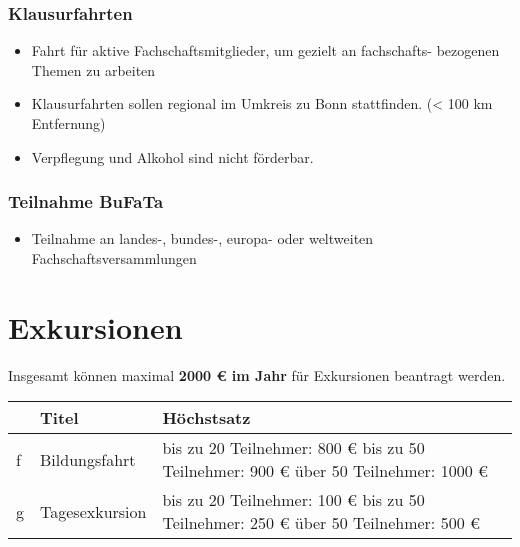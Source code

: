 \documentclass{article}
\begin{document}
        \subsubsection{Klausurfahrten}
            \begin{itemize}
                \item  Fahrt für aktive Fachschaftsmitglieder, um gezielt an fachschafts- bezogenen Themen zu arbeiten 
                \item Klausurfahrten sollen regional im Umkreis zu Bonn stattfinden. (< 100 km Entfernung)
                \item Verpflegung und Alkohol sind nicht förderbar.
            \end{itemize}
        \subsubsection{Teilnahme BuFaTa}
            \begin{itemize}
                \item Teilnahme an landes-, bundes-, europa- oder weltweiten Fachschaftsversammlungen
            \end{itemize}

\newpage

 \section{Exkursionen}
    Insgesamt können maximal \textbf{2000 € im Jahr} für Exkursionen beantragt werden. \\
    
    \setlength\extrarowheight{2mm} \sffamily
    \begin{tabular}{l||L{6cm}|L{7cm}}
        &\textbf{Titel} &  \textbf{Höchstsatz}\\[1mm] \hline \hline
        f&
        Bildungsfahrt &
        bis zu 20 Teilnehmer: 800 € \newline
        bis zu 50 Teilnehmer: 900 € \newline
        über 50 Teilnehmer: 1000 € \\[1mm] \hline
         
        g&
        Tagesexkursion &
        bis zu 20 Teilnehmer: 100 € \newline
        bis zu 50 Teilnehmer: 250 € \newline
        über 50 Teilnehmer: 500 € \\[1mm]
    \end{tabular}
    \rmfamily
\end{document}
